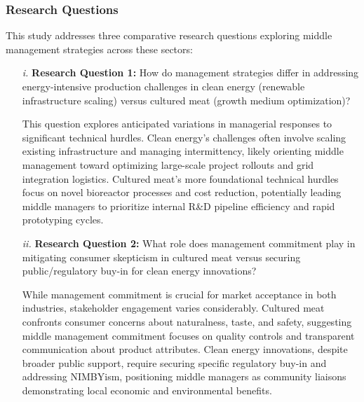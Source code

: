	\subsubsection{Research Questions}
	This study addresses three comparative research questions exploring middle management strategies across these sectors:
	\begin{enumerate}
		\item[\textit{i.}] \textbf{Research Question 1:} How do management strategies differ in addressing energy-intensive production challenges in clean energy (renewable infrastructure scaling) versus cultured meat (growth medium optimization)?
		
		This question explores anticipated variations in managerial responses to significant technical hurdles. Clean energy’s challenges often involve scaling existing infrastructure and managing intermittency, likely orienting middle management toward optimizing large-scale project rollouts and grid integration logistics. Cultured meat’s more foundational technical hurdles focus on novel bioreactor processes and cost reduction, potentially leading middle managers to prioritize internal R\&D pipeline efficiency and rapid prototyping cycles.
		
		\item[\textit{ii.}] \textbf{Research Question 2:} What role does management commitment play in mitigating consumer skepticism in cultured meat versus securing public/regulatory buy-in for clean energy innovations?
		
		While management commitment is crucial for market acceptance in both industries, stakeholder engagement varies considerably. Cultured meat confronts consumer concerns about naturalness, taste, and safety, suggesting middle management commitment focuses on quality controls and transparent communication about product attributes. Clean energy innovations, despite broader public support, require securing specific regulatory buy-in and addressing NIMBYism, positioning middle managers as community liaisons demonstrating local economic and environmental benefits.
		
	\end{enumerate}
	
